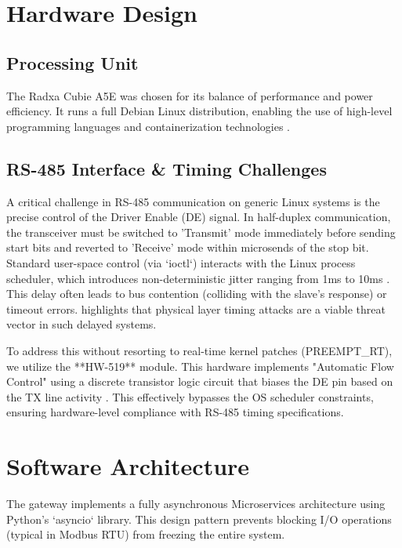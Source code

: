 \documentclass[journal]{IEEEtran}
\begin{document}
\section{Hardware Design}
\subsection{Processing Unit}
The Radxa Cubie A5E was chosen for its balance of performance and power efficiency. It runs a full Debian Linux distribution, enabling the use of high-level programming languages and containerization technologies \cite{radxa_cm5}.

\subsection{RS-485 Interface \& Timing Challenges}
A critical challenge in RS-485 communication on generic Linux systems is the precise control of the Driver Enable (DE) signal. In half-duplex communication, the transceiver must be switched to 'Transmit' mode immediately before sending start bits and reverted to 'Receive' mode within microsends of the stop bit.
Standard user-space control (via `ioctl`) interacts with the Linux process scheduler, which introduces non-deterministic jitter ranging from 1ms to 10ms \cite{rs485_linux_jitter, linux_realtime_performance}. This delay often leads to bus contention (colliding with the slave's response) or timeout errors.
\cite{modbus_security} highlights that physical layer timing attacks are a viable threat vector in such delayed systems.

To address this without resorting to real-time kernel patches (PREEMPT\_RT), we utilize the **HW-519** module. This hardware implements "Automatic Flow Control" using a discrete transistor logic circuit that biases the DE pin based on the TX line activity \cite{hw519_datasheet}. This effectively bypasses the OS scheduler constraints, ensuring hardware-level compliance with RS-485 timing specifications.

\section{Software Architecture}
The gateway implements a fully asynchronous Microservices architecture using Python's `asyncio` library. This design pattern prevents blocking I/O operations (typical in Modbus RTU) from freezing the entire system.
\end{document}
